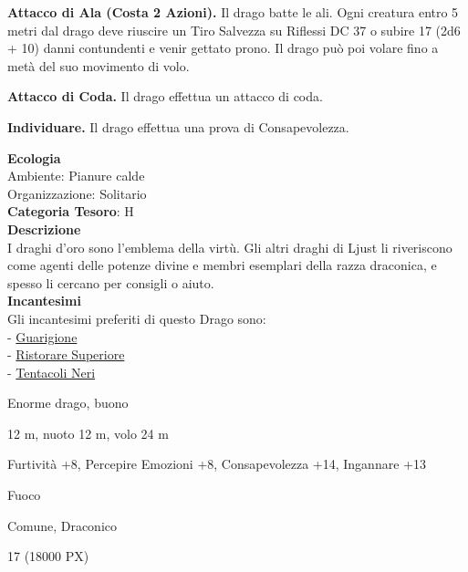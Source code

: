 \begin{multicols}{2}
{\textbf{Attacco di Ala (Costa 2 Azioni).} Il drago batte le ali. Ogni creatura entro 5 metri dal drago deve riuscire un Tiro Salvezza su Riflessi DC 37 o subire 17 (2d6 + 10) danni contundenti e venir gettato prono. Il drago può poi volare fino a metà del suo movimento di volo.

\textbf{Attacco di Coda.} Il drago effettua un attacco di coda.

\textbf{Individuare.} Il drago effettua una prova di Consapevolezza.

\textbf{Ecologia}\\
Ambiente: Pianure calde\\
Organizzazione: Solitario\\
\textbf{Categoria Tesoro}: H\\
\textbf{Descrizione}\\
I draghi d'oro sono l'emblema della virtù. Gli altri draghi di Ljust li riveriscono come agenti delle potenze divine e membri esemplari della razza draconica, e spesso li cercano per consigli o aiuto.\\
\textbf{Incantesimi}\\
Gli incantesimi preferiti di questo Drago sono:\\
- \hyperlink{Guarigione}{Guarigione}\\
- \hyperlink{Ristorare Superiore}{Ristorare Superiore}\\
- \hyperlink{Tentacoli Neri}{Tentacoli Neri}

\begin{description}[noitemsep, topsep=0pt, parsep=0pt, partopsep=0pt, itemsep=1pt, leftmargin=2.35cm,  labelwidth=2.2cm, itemindent=0cm, listparindent=0pt] %
\setlength{\baselineskip}{10pt}
\item[\textbf{Taglia/Tipo}] Enorme drago, buono
\item[\textbf{Caratt.}] 
\item[\textbf{Punti Ferita}] 
\item[\textbf{Movimento}] 12 m, nuoto 12 m, volo 24 m
\item[\textbf{Tiri Salvez.}] 
\item[\textbf{Comp.}] Furtività +8, Percepire Emozioni +8, Consapevolezza +14, Ingannare +13
\item[\textbf{Imm. Danni}] Fuoco
\item[\textbf{Sensi}] 
\item[\textbf{Linguaggi}] Comune, Draconico
\item[\textbf{Sfida}] 17 (18000 PX)
\end{description}
\smallskip

}
\end{multicols}
